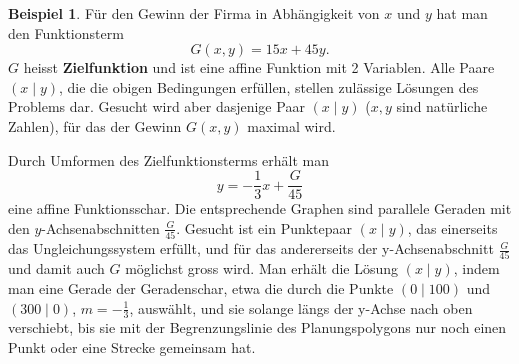 \documentclass[%
11pt,%
twoside,%
titlepage,%
swissgerman,%
headsepline%
]{scrartcl}
\theoremstyle{definition}
\newtheorem{bsp}{Beispiel}[subsection] %
\theoremstyle{plain}
\begin{document}
\begin{bsp}
Für den Gewinn der Firma in Abhängigkeit von $x$ und $y$ hat man den Funktionsterm
$$G(x,y)=15x+45y.$$
$G$ heisst \textbf{Zielfunktion} und ist eine affine Funktion mit 2 Variablen. Alle Paare $(x\mid y)$, die die obigen Bedingungen erfüllen, stellen zulässige Lösungen des Problems dar. Gesucht wird aber dasjenige Paar $(x\mid y)$ ($x,y$ sind natürliche Zahlen), für das der Gewinn $G(x,y)$ maximal wird.

Durch Umformen des Zielfunktionsterms erhält man
$$y=-\frac{1}{3}x+\frac{G}{45}$$
eine affine Funktionsschar. Die entsprechende Graphen sind parallele Geraden mit den $y$-Achsenabschnitten $\frac{G}{45}$. Gesucht ist ein Punktepaar $(x\mid y)$, das einerseits das Ungleichungssystem erfüllt, und für das andererseits der y-Achsenabschnitt $\frac{G}{45}$ und damit auch $G$ möglichst gross wird.
Man erhält die Lösung $(x\mid y)$, indem man eine Gerade der Geradenschar, etwa die durch die Punkte $(0\mid 100)$ und $(300\mid 0)$, $m=-\frac{1}{3}$, auswählt, und sie solange längs der y-Achse nach oben verschiebt, bis sie mit der Begrenzungslinie des Planungspolygons nur noch einen Punkt oder eine Strecke gemeinsam hat.
\begin{figure}[h!]
\begin{center}
\end{center}
\end{figure}
\end{bsp}
\end{document}

